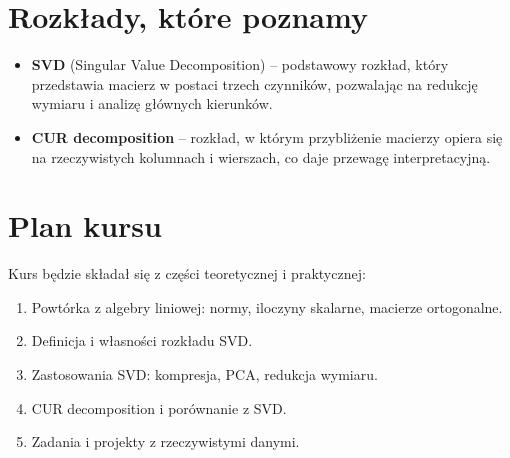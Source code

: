 \documentclass[10pt,a4paper]{article}
\begin{document}
\section*{Rozkłady, które poznamy}
\begin{itemize}
    \item \textbf{SVD} (Singular Value Decomposition) -- podstawowy rozkład, 
    który przedstawia macierz w postaci trzech czynników, 
    pozwalając na redukcję wymiaru i analizę głównych kierunków.
    
    \item \textbf{CUR decomposition} -- rozkład, w którym przybliżenie macierzy 
    opiera się na rzeczywistych kolumnach i wierszach, 
    co daje przewagę interpretacyjną.
\end{itemize}

\section*{Plan kursu}
Kurs będzie składał się z części teoretycznej i praktycznej:
\begin{enumerate}
    \item Powtórka z algebry liniowej: normy, iloczyny skalarne, 
    macierze ortogonalne.
    \item Definicja i własności rozkładu SVD.
    \item Zastosowania SVD: kompresja, PCA, redukcja wymiaru.
    \item CUR decomposition i porównanie z SVD.
    \item Zadania i projekty z rzeczywistymi danymi.
\end{enumerate}
\end{document}
